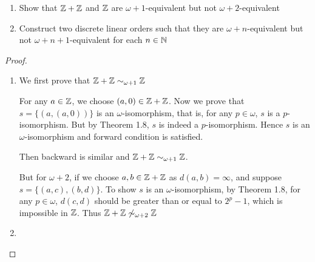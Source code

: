 \documentclass[11pt]{article}
\begin{document}
\begin{exercise}
\begin{enumerate}
\item Show that \(\mathbb{Z}+\mathbb{Z}\) and \(\mathbb{Z}\) are \(\omega+1\)-equivalent but not \(\omega+2\)-equivalent
\item Construct two discrete linear orders such that they are \(\omega+n\)-equivalent but
not \(\omega+n+1\)-equivalent for each \(n\in\mathbb{N}\)
\end{enumerate}
\end{exercise}

\begin{proof}
\begin{enumerate}
\item We first prove that \(\mathbb{Z}+\mathbb{Z}\sim_{\omega+1}\mathbb{Z}\)

 For any \(a\in\mathbb{Z}\), we choose \((a,0)\in\mathbb{Z}+\mathbb{Z}\). Now we prove that \(s=\{(a,(a,0))\}\) is an
\(\omega\)-isomorphism, that is, for any \(p\in\omega\), \(s\) is a \(p\)-isomorphism. But by Theorem 1.8, \(s\)
is indeed a \(p\)-isomorphism. Hence \(s\) is an \(\omega\)-isomorphism and forward condition is
satisfied.

Then backward is similar and \(\mathbb{Z}+\mathbb{Z}\sim_{\omega+1}\mathbb{Z}\).

But for \(\omega+2\), if we choose \(a,b\in\mathbb{Z}+\mathbb{Z}\) as \(d(a,b)=\infty\), and suppose \(s=\{(a,c),(b,d)\}\). To
show \(s\) is an \(\omega\)-isomorphism, by
Theorem 1.8, for any \(p\in\omega\), \(d(c,d)\) should be greater than or equal to \(2^p-1\), which is
impossible in \(\mathbb{Z}\). Thus \(\mathbb{Z}+\mathbb{Z}\not\sim_{\omega+2}\mathbb{Z}\)

\item 
\end{enumerate}
\end{proof}
\end{document}

